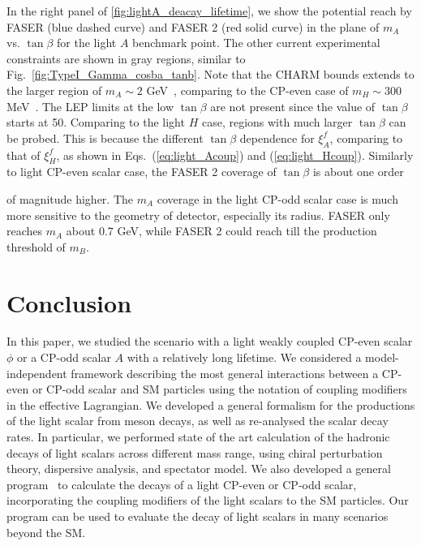 \documentclass[letterpaper,11pt]{article}
\newcommand{\tanb}{\tan \beta}
\begin{document}
 
 In the right panel of \autoref{fig:lightA_deacay_lifetime}, we show the potential reach by FASER (blue dashed curve) and FASER 2 (red solid curve) in the plane of $m_A$ vs. $\tanb$ for the light $A$ benchmark point.  The other current experimental constraints are shown in gray regions, similar to Fig.~\ref{fig:TypeI_Gamma_cosba_tanb}.  Note that the CHARM bounds extends to the larger region of $m_A\sim 2$ GeV~\cite{Dobrich:2018jyi}, comparing to the CP-even case of  $m_H\sim 300$ MeV~\cite{Winkler:2018qyg}.    The LEP limits at the low $\tan\beta$  are  not present since the value of $\tan\beta$ starts at 50.   Comparing to the light $H$ case, regions with much larger $\tan\beta$ can be probed.  This is because the different $\tan\beta$ dependence for $\xi_A^f$, comparing to that of $\xi_H^f$, as shown in Eqs.~(\ref{eq:light_Acoup}) and (\ref{eq:light_Hcoup}).  Similarly to light CP-even scalar case, the FASER 2 coverage of $\tan\beta$ is about one order {of magnitude higher. The $m_A$ coverage in the light CP-odd scalar case is much more sensitive to the geometry of detector, especially its radius.  FASER only reaches $m_A$ about 0.7 GeV, while FASER 2 could reach till the production threshold of $m_B$.
 


 
\section{Conclusion}
\label{sec:conclusion} 

In this paper, we studied the scenario with a light weakly coupled CP-even scalar $\phi$ or a CP-odd scalar $A$ with a relatively long lifetime. We considered a model-independent framework describing the most general interactions between a CP-even or CP-odd scalar and SM particles using the notation of coupling modifiers in the effective Lagrangian.  We developed a general formalism for  the productions of the light scalar from meson decays, as well as  re-analysed the scalar decay rates.   In particular, we performed state of the art calculation of the hadronic decays of light scalars across different mass range, using chiral perturbation theory, dispersive analysis, and spectator model.  We also developed a general program~\cite{LSDedcay} to calculate the decays of a light CP-even or CP-odd scalar, incorporating the coupling modifiers of the light scalars to the SM particles.  Our program can be used to evaluate the decay of light scalars in many  scenarios beyond the SM. 

}
\end{document}
